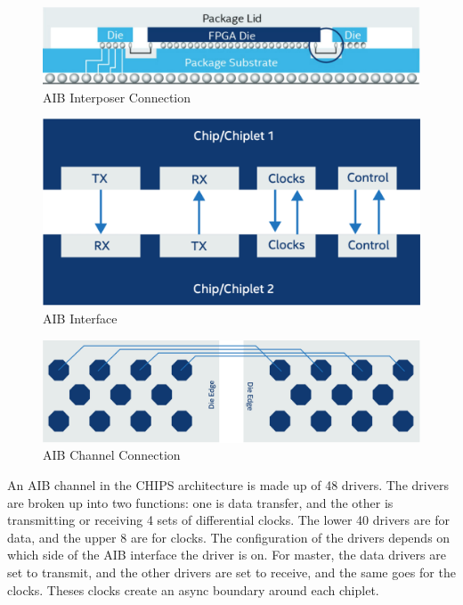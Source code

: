 \documentclass[../main.tex]{subfiles}
\begin{document}
\begin{figure}
    \centering
    \includegraphics[scale=.25]{pngs/Interposer.png}
    \caption{AIB Interposer Connection\cite{AIBWhitePaper}}
    \label{fig:AIBInterposer}
\end{figure}
\begin{figure}
    \centering
    \includegraphics[scale=.32]{pngs/AIB-interface.png}
    \caption{AIB Interface\cite{AIBWhitePaper}}
    \label{fig:AIBInterface}
\end{figure}

\begin{figure}
    \centering
    \includegraphics[scale=.17]{pngs/AIB-Channel.png}
    \caption{AIB Channel Connection\cite{AIBWhitePaper}}
    \label{fig:AIBChannel}
\end{figure}

An AIB channel in the CHIPS architecture is made up of 48 drivers. The drivers are broken up into two functions: one is data transfer, and the other is transmitting or receiving 4 sets of differential clocks. The lower 40 drivers are for data, and the upper 8 are for clocks. The configuration of the drivers depends on which side of the AIB interface the driver is on. For master, the data drivers are set to transmit, and the other drivers are set to receive, and the same goes for the clocks. Theses clocks create an async boundary around each chiplet. 
\end{document}
